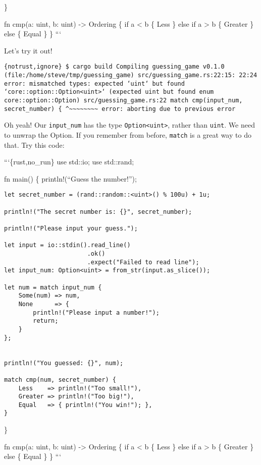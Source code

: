 \documentclass[]{article}
\begin{document}
\}

fn cmp(a: uint, b: uint) -\textgreater{} Ordering \{ if a \textless{} b
\{ Less \} else if a \textgreater{} b \{ Greater \} else \{ Equal \} \}
```

Let's try it out!

\texttt{\{notrust,ignore\} \$ cargo build    Compiling guessing\_game v0.1.0 (file:/home/steve/tmp/guessing\_game) src/guessing\_game.rs:22:15: 22:24 error: mismatched types: expected `uint` but found `core::option::Option\textless{}uint\textgreater{}` (expected uint but found enum core::option::Option) src/guessing\_game.rs:22     match cmp(input\_num, secret\_number) \{                                       \^{}\textasciitilde{}\textasciitilde{}\textasciitilde{}\textasciitilde{}\textasciitilde{}\textasciitilde{}\textasciitilde{}\textasciitilde{} error: aborting due to previous error}

Oh yeah! Our \texttt{input\_num} has the type
\texttt{Option\textless{}uint\textgreater{}}, rather than \texttt{uint}.
We need to unwrap the Option. If you remember from before,
\texttt{match} is a great way to do that. Try this code:

```\{rust,no\_run\} use std::io; use std::rand;

fn main() \{ println!(``Guess the number!'');

\begin{verbatim}
let secret_number = (rand::random::<uint>() % 100u) + 1u;

println!("The secret number is: {}", secret_number);

println!("Please input your guess.");

let input = io::stdin().read_line()
                       .ok()
                       .expect("Failed to read line");
let input_num: Option<uint> = from_str(input.as_slice());

let num = match input_num {
    Some(num) => num,
    None      => {
        println!("Please input a number!");
        return;
    }
};


println!("You guessed: {}", num);

match cmp(num, secret_number) {
    Less    => println!("Too small!"),
    Greater => println!("Too big!"),
    Equal   => { println!("You win!"); },
}
\end{verbatim}

\}

fn cmp(a: uint, b: uint) -\textgreater{} Ordering \{ if a \textless{} b
\{ Less \} else if a \textgreater{} b \{ Greater \} else \{ Equal \} \}
```
\end{document}

